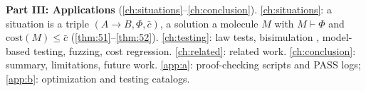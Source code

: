 \textbf{Part III: Applications} (\autoref{ch:situations}--\autoref{ch:conclusion}). \autoref{ch:situations}: a situation is a triple $(A\to B, \Phi, \bar{c})$, a solution a molecule $M$ with $M \vdash \Phi$ and $\mathrm{cost} (M) \leq \bar{c}$ (\autoref{thm:51}--\autoref{thm:52}). \autoref{ch:testing}: law tests, bisimulation \citep{park}, model-based testing, fuzzing, cost regression. \autoref{ch:related}: related work. \autoref{ch:conclusion}: summary, limitations, future work. \autoref{app:a}: proof-checking scripts and PASS logs; \autoref{app:b}: optimization and testing catalogs.
